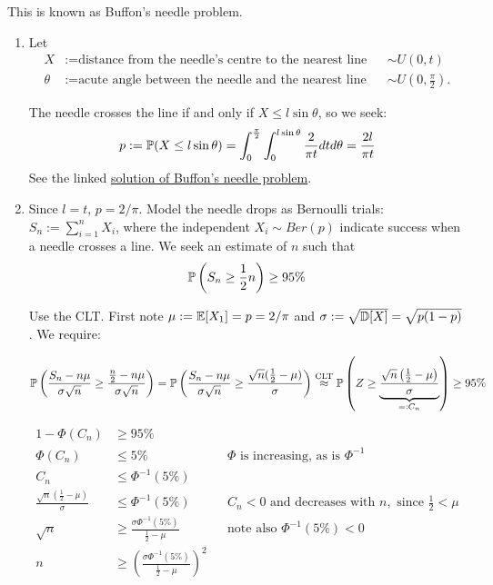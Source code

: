 \documentclass[a4paper]{report}
\begin{document}
\begin{solution}
    This is known as Buffon's needle problem.
    \begin{enumerate}
        \item Let
        \begin{align*}
            X&:=\text{distance from the needle's centre to the nearest line}&&\sim U(0,t)\\
            \theta&:=\text{acute angle between the needle and the nearest line}&&\sim U\left(0,\frac\pi2\right).
        \end{align*}

        The needle crosses the line if and only if $X\leq l\sin\theta$, so we seek:
        \[p := \P(X \le l\sin\theta) = \int_0^{\frac{\pi}{2}}\int_{0}^{l\sin\theta}\frac{2}{\pi t}dtd\theta = \frac{2l}{\pi t}\]
        See the linked \href{https://en.wikipedia.org/wiki/Buffon\%27s_needle_problem}{solution of Buffon's needle problem}.
        \item Since $l=t$, $p=2/\pi$. Model the needle drops as Bernoulli trials: $S_n:=\sum_{i=1}^nX_i$, where the independent $X_i\sim Ber(p)$ indicate success when a needle crosses a line. We seek an estimate of $n$ such that
        \[\P\left(S_n \ge \frac{1}{2}n\right) \ge 95\%\]

        Use the CLT. First note $\mu:=\E[X_1]=p=2/\pi$ and $\sigma:=\sqrt{\D[X]}=\sqrt{p(1-p)}$. We require:

        \[\P\left(\frac{S_n - n\mu}{\sigma\sqrt{n}} \ge \frac{\frac{n}{2} - n\mu}{\sigma\sqrt{n}}\right)
        =\P\left(\frac{S_n-n\mu}{\sigma\sqrt n}\geq\frac{\sqrt n(\frac12-\mu)}{\sigma}\right)\stackrel{\text{CLT}}{\approx}
        \P\left(Z \ge \underbrace{\frac{\sqrt{n}\left(\frac{1}{2} - \mu\right)}{\sigma}}_{=: C_n}\right) \ge 95\%\]

        \begin{align*}
            1 - \Phi\left(C_n\right) &\ge 95\% \\
            \Phi(C_n)&\leq5\%&&\Phi\text{ is increasing, as is }\Phi^{-1}\\
            C_n &\le \Phi^{-1}(5\%)\\
            \frac{\sqrt n(\frac12-\mu)}{\sigma}&\leq\Phi^{-1}(5\%)&&C_n<0\text{ and decreases with }n,\text{ since }\tfrac12<\mu\\
            \sqrt n&\geq\frac{\sigma\Phi^{-1}(5\%)}{\frac12-\mu}&&\text{note also }\Phi^{-1}(5\%)<0\\
            n &\ge \left(\frac{\sigma \Phi^{-1}(5\%)}{\frac{1}{2}-\mu}\right)^2
        \end{align*}


\end{enumerate}
\end{solution}
\end{document}
